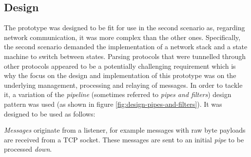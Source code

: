 \subsection{Design}
\label{sec:prototype-design}
The prototype was designed to be fit for use in the second scenario as, regarding network communication, it was more complex than the other ones. Specifically, the second scenario demanded the implementation of a network stack and a state machine to switch between states.
Parsing protocols that were tunnelled through other protocols appeared to be a potentially challenging requirement which is why the focus on the design and implementation of this prototype was on the underlying management, processing and relaying of messages. In order to tackle it, a variation of the \emph{pipeline} (sometimes referred to \emph{pipes and filters}) design pattern was used (as shown in figure \ref{fig:design-pipes-and-filters}). It was designed to be used as follows:\par
\emph{Messages} originate from a listener, for example messages with raw byte payloads are received from a \ac{TCP} socket. These messages are sent to an initial \emph{pipe} to be processed \emph{down}.

